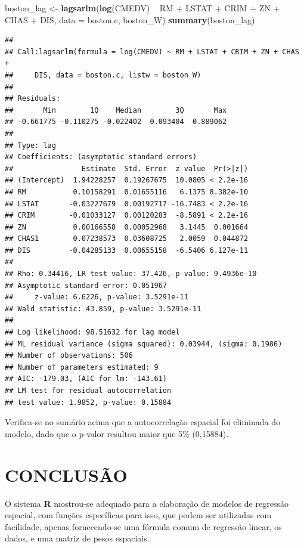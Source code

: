 \documentclass[12pt,]{article}
\newenvironment{Shaded}{\begin{snugshade}}{\end{snugshade}}
\newcommand{\KeywordTok}[1]{\textcolor[rgb]{0.13,0.29,0.53}{\textbf{{#1}}}}
\newcommand{\DataTypeTok}[1]{\textcolor[rgb]{0.13,0.29,0.53}{{#1}}}
\newcommand{\StringTok}[1]{\textcolor[rgb]{0.31,0.60,0.02}{{#1}}}
\newcommand{\NormalTok}[1]{{#1}}
\begin{document}
\begin{Shaded}
\begin{Highlighting}[]
\NormalTok{boston_lag <-}\StringTok{ }\KeywordTok{lagsarlm}\NormalTok{(}\KeywordTok{log}\NormalTok{(CMEDV) ~}\StringTok{ }\NormalTok{RM +}\StringTok{ }\NormalTok{LSTAT +}\StringTok{ }\NormalTok{CRIM +}\StringTok{ }\NormalTok{ZN +}\StringTok{ }\NormalTok{CHAS +}\StringTok{ }\NormalTok{DIS, }\DataTypeTok{data =} \NormalTok{boston.c, boston_W)}
\KeywordTok{summary}\NormalTok{(boston_lag)}
\end{Highlighting}
\end{Shaded}

\begin{verbatim}
## 
## Call:lagsarlm(formula = log(CMEDV) ~ RM + LSTAT + CRIM + ZN + CHAS + 
##     DIS, data = boston.c, listw = boston_W)
## 
## Residuals:
##       Min        1Q    Median        3Q       Max 
## -0.661775 -0.110275 -0.022402  0.093404  0.889062 
## 
## Type: lag 
## Coefficients: (asymptotic standard errors) 
##                Estimate  Std. Error  z value  Pr(>|z|)
## (Intercept)  1.94228257  0.19267675  10.0805 < 2.2e-16
## RM           0.10158291  0.01655116   6.1375 8.382e-10
## LSTAT       -0.03227679  0.00192717 -16.7483 < 2.2e-16
## CRIM        -0.01033127  0.00120283  -8.5891 < 2.2e-16
## ZN           0.00166558  0.00052968   3.1445  0.001664
## CHAS1        0.07238573  0.03608725   2.0059  0.044872
## DIS         -0.04285133  0.00655158  -6.5406 6.127e-11
## 
## Rho: 0.34416, LR test value: 37.426, p-value: 9.4936e-10
## Asymptotic standard error: 0.051967
##     z-value: 6.6226, p-value: 3.5291e-11
## Wald statistic: 43.859, p-value: 3.5291e-11
## 
## Log likelihood: 98.51632 for lag model
## ML residual variance (sigma squared): 0.03944, (sigma: 0.1986)
## Number of observations: 506 
## Number of parameters estimated: 9 
## AIC: -179.03, (AIC for lm: -143.61)
## LM test for residual autocorrelation
## test value: 1.9852, p-value: 0.15884
\end{verbatim}

Verifica-se no sumário acima que a autocorrelação espacial foi eliminada
do modelo, dado que o p-valor resultou maior que 5\% (0,15884).

\section{CONCLUSÃO}\label{conclusao}

O sistema \textbf{R} mostrou-se adequado para a elaboração de modelos de
regressão espacial, com funções específicas para isso, que podem ser
utilizadas com facilidade, apenas fornecendo-se uma fórmula comum de
regressão linear, os dados, e uma matriz de pesos espaciais.
\end{document}
